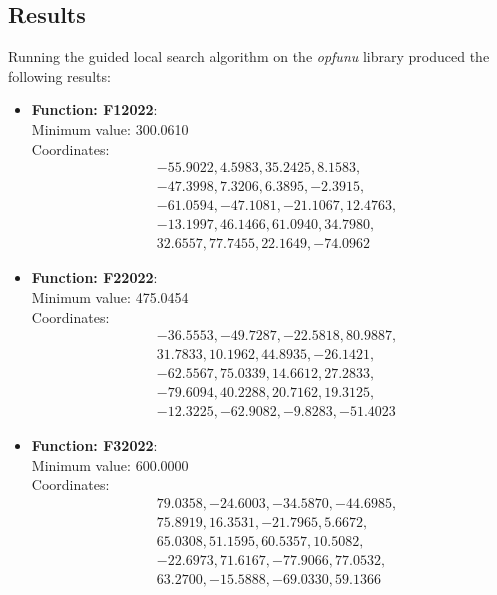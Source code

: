\documentclass{article}
\begin{document}
\subsection{Results}

Running the guided local search algorithm on the \textit{opfunu} library
produced the following results:

\begin{itemize}
  \item \textbf{Function: F12022}: \\
    Minimum value: 300.0610 \\
    Coordinates:
    \[
      \begin{aligned}
        & -55.9022, 4.5983, 35.2425, 8.1583, \\
        & -47.3998, 7.3206, 6.3895, -2.3915, \\
        & -61.0594, -47.1081, -21.1067, 12.4763, \\
        & -13.1997, 46.1466, 61.0940, 34.7980, \\
        & 32.6557, 77.7455, 22.1649, -74.0962
      \end{aligned}
    \]

  \item \textbf{Function: F22022}: \\
    Minimum value: 475.0454 \\
    Coordinates:
    \[
      \begin{aligned}
        & -36.5553, -49.7287, -22.5818, 80.9887, \\
        & 31.7833, 10.1962, 44.8935, -26.1421, \\
        & -62.5567, 75.0339, 14.6612, 27.2833, \\
        & -79.6094, 40.2288, 20.7162, 19.3125, \\
        & -12.3225, -62.9082, -9.8283, -51.4023
      \end{aligned}
    \]

  \item \textbf{Function: F32022}: \\
    Minimum value: 600.0000 \\
    Coordinates:
    \[
      \begin{aligned}
        & 79.0358, -24.6003, -34.5870, -44.6985, \\
        & 75.8919, 16.3531, -21.7965, 5.6672, \\
        & 65.0308, 51.1595, 60.5357, 10.5082, \\
        & -22.6973, 71.6167, -77.9066, 77.0532, \\
        & 63.2700, -15.5888, -69.0330, 59.1366
      \end{aligned}
    \]


\end{itemize}
\end{document}
